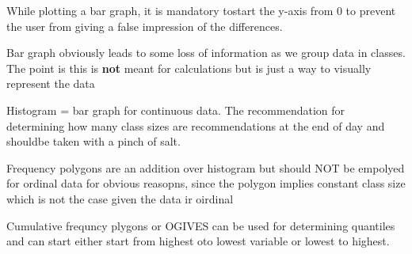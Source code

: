\documentclass[a4paper]{article}
\begin{document}
While plotting a bar graph, it is mandatory tostart 
the y-axis from 0 to prevent the user from giving a false impression
of the differences.

Bar graph obviously leads to some loss of information as we group 
data in classes. The point is this is \textbf{not }meant  for calculations
but is just a way to visually represent the data

Histogram = bar graph for continuous data. The recommendation for determining
how many class sizes are recommendations at the end of day and shouldbe taken with
a pinch of salt.

Frequency polygons are an addition over histogram but should NOT be empolyed
for ordinal data for obvious reasopns, since the polygon implies
constant class size which is not the case given the data ir oirdinal

Cumulative frequncy plygons or OGIVES can be used for determining quantiles and
can start either start from highest oto lowest variable or lowest to highest.
\end{document}
